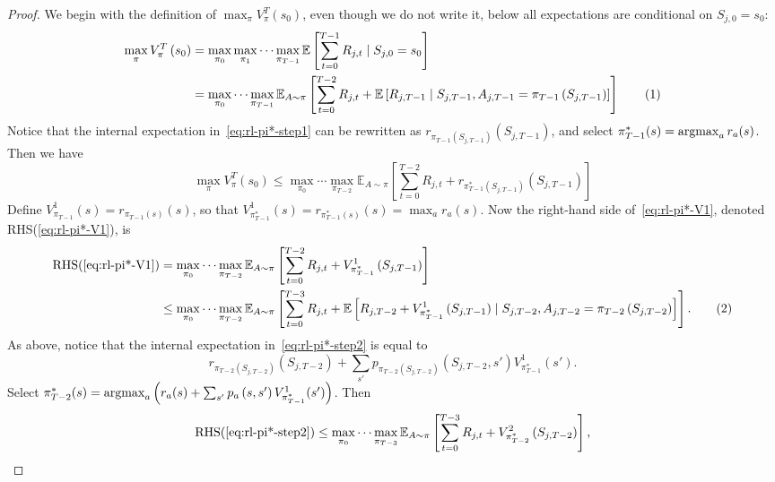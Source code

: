 \documentclass[11pt]{article}
\newcommand{\numbereqn}{\addtocounter{equation}{1}\tag{\theequation}}
\begin{document}
\begin{proof}
	We begin with the definition of $\max_{\pi}V_{\pi}^{T}(s_0)$, even though we do not write it, below all expectations are conditional on $S_{j,0} = s_{0}$:
	\begin{align*}
		\max_{\pi} V_{\pi}^{T}\left(s_{0}\right) &= \max_{\pi_{0}} \max_{\pi_{1}} \cdots \max_{\pi_{T-1}} \mathbb{E}\left[\sum_{t=0}^{T-1} R_{j, t} \mid S_{j,0} = s_{0}\right] \\
		&= \max_{\pi_{0}}\cdots \max_{\pi_{T-1}} \mathbb{E}_{A\sim\pi} \left[\sum_{t=0}^{T-2} R_{j,t} + \mathbb{E}\left[R_{j,T-1} \mid S_{j,T-1}, A_{j,T-1} = \pi_{T-1}\left(S_{j,T-1}\right)\right]\right] \numbereqn \label{eq:rl-pi*-step1}
	\end{align*}
	Notice that the internal expectation in~\cref{eq:rl-pi*-step1} can be rewritten as $r_{\pi_{T-1}(S_{j, T-1})}\left(S_{j,T-1}\right)$, and select $\pi_{T-1}^{*}(s) = \operatorname*{argmax}_{a} r_{a}(s)$. Then we have
	\begin{equation}
		\label{eq:rl-pi*-V1}
		\max_{\pi} V_{\pi}^{T}\left(s_{0}\right) \leq \max_{\pi_{0}}\cdots\max_{\pi_{T-2}} \mathbb{E}_{A\sim\pi} \left[\sum_{t=0}^{T-2} R_{j,t} + r_{\pi^{*}_{T-1}\left(S_{j,T-1}\right)} \left(S_{j,T-1}\right)  \right]
	\end{equation}
	Define $V_{\pi_{T-1}}^{1}(s) = r_{\pi_{T-1}(s)}(s)$, so that $V_{\pi_{T-1}^{*}}^{1}(s) = r_{\pi_{T-1}^{*}(s)}(s) = \max_{a} r_{a}(s)$. Now the right-hand side of~\cref{eq:rl-pi*-V1}, denoted RHS(\ref{eq:rl-pi*-V1}), is
	\begin{align*}
		\text{RHS(\ref{eq:rl-pi*-V1})} &= \max_{\pi_{0}}\cdots\max_{\pi_{T-2}} \mathbb{E}_{A\sim \pi}\left[ \sum_{t=0}^{T-2} R_{j, t} + V^1_{\pi_{T-1}^{*}}\left(S_{j, T-1}\right) \right] \\
		&\leq \max_{\pi_{0}} \cdots \max_{\pi_{T-2}} \mathbb{E}_{A\sim \pi} \left[\sum_{t=0}^{T-3} R_{j,t} + \mathbb{E}\left[ R_{j,T-2} + V_{\pi_{T-1}^{*}}^{1}\left(S_{j,T-1}\right) \mid S_{j,T-2}, A_{j,T-2} = \pi_{T-2}\left(S_{j,T-2}\right) \right]\right]. \numbereqn \label{eq:rl-pi*-step2}
	\end{align*}
	As above, notice that the internal expectation in~\cref{eq:rl-pi*-step2} is equal to 
	\[
		r_{\pi_{T-2}\left(S_{j,T-2}\right)}\left(S_{j,T-2}\right) + \sum_{s'} p_{\pi_{T-2}\left(S_{j,T-2}\right)}\left(S_{j,T-2}, s'\right) V_{\pi_{T-1}^{*}}^{1}\left(s'\right).
	\]
	Select $\pi_{T-2}^{*}(s) = \operatorname*{argmax}_{a} \left(r_{a}(s) + \sum_{s'} p_{a}\left(s,s'\right) V^1_{\pi^*_{T-1}}(s')\right)$. Then
	\[
		\text{RHS(\ref{eq:rl-pi*-step2})} \leq \max_{\pi_{0}} \cdots \max_{\pi_{T-3}} \mathbb{E}_{A\sim\pi} \left[ \sum_{t=0}^{T-3} R_{j,t} + V_{\pi^*_{T-2}}^{2}\left(S_{j,T-2}\right) \right],
\]
\end{proof}
\end{document}
